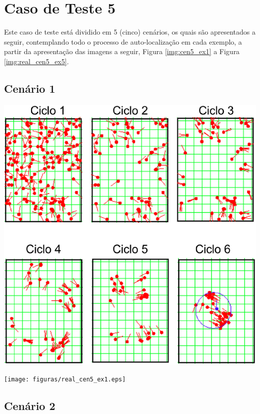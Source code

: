 \section{Caso de Teste 5}
\label{sec:cenario5}

Este caso de teste está dividido em 5 (cinco) cenários, os quais são apresentados a seguir, contemplando todo o processo de auto-localização
em cada exemplo, a partir da apresentação das imagens a seguir, Figura \ref{img:cen5_ex1} a Figura \ref{img:real_cen5_ex5}.

\subsection{Cenário 1}

{\centering
\includegraphics[scale=0.4]{figuras/cen5_ex1.eps}
\label{img:cen5_ex1}
\par}

{\centering
\texttt{[image: figuras/real\_cen5\_ex1.eps]}
\label{img:real_cen5_ex1}
\par}

\subsection{Cenário 2}

